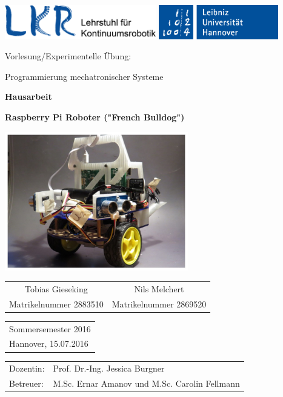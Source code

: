 \begin{titlepage}

\begin{flushleft}
	\includegraphics[height=1.5cm]{figs/LKR_Logo.png}
	\hfill
	\includegraphics[height=1.5cm]{figs/LUH_Logo.jpg}
\end{flushleft}

\vspace{10mm} 
\begin{center}
\Large{Vorlesung/Experimentelle \"Ubung: 

Programmierung mechatronischer Systeme

\vspace{5mm}

\textbf{Hausarbeit}}

\vspace{5mm}
\textbf{\LARGE{Raspberry Pi Roboter ("French Bulldog")}}
\end{center}

\vfill
\begin{center}
\includegraphics[width = 80mm]{figs/PiRobot.jpg}
\end{center}

\vfill

\begin{center}
\begin{tabular}{c c}
\large{Tobias Gieseking} & \large{Nils Melchert}\\
\large{Matrikelnummer 2883510} & \large{Matrikelnummer 2869520}
\end{tabular}
\end{center}
\vspace{15mm}

\begin{tabular}{l}
\large{Sommersemester 2016}\\
\large{Hannover, 15.07.2016}
\end{tabular}


\vspace{15mm}
{\large
\begin{tabular}{l l}
Dozentin:  & Prof. Dr.-Ing. Jessica Burgner\\
Betreuer: & M.Sc. Ernar Amanov und M.Sc. Carolin Fellmann\\
\end{tabular}
}

\end{titlepage}
